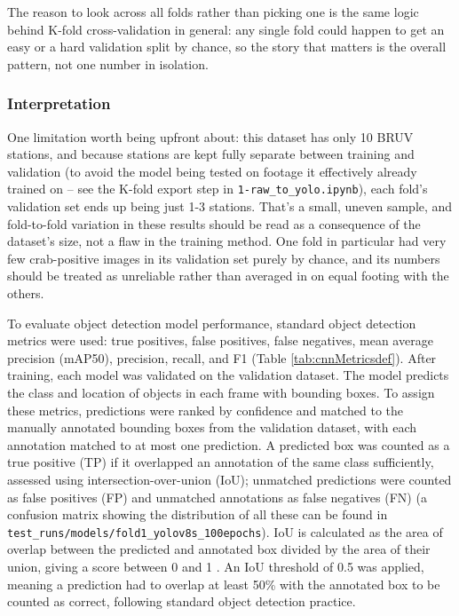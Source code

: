 \documentclass[
]{book}
\begin{document}
The reason to look across all folds rather than picking one is the same logic behind K-fold cross-validation in general: any single fold could happen to get an easy or a hard validation split by chance, so the story that matters is the overall pattern, not one number in isolation.

\subsubsection*{Interpretation}\label{interpretation}

One limitation worth being upfront about: this dataset has only 10 BRUV stations, and because stations are kept fully separate between training and validation (to avoid the model being tested on footage it effectively already trained on -- see the K-fold export step in \texttt{1-raw\_to\_yolo.ipynb}), each fold's validation set ends up being just 1-3 stations. That's a small, uneven sample, and fold-to-fold variation in these results should be read as a consequence of the dataset's size, not a flaw in the training method. One fold in particular had very few crab-positive images in its validation set purely by chance, and its numbers should be treated as unreliable rather than averaged in on equal footing with the others.

To evaluate object detection model performance, standard object detection metrics were used: true positives, false positives, false negatives, mean average precision (mAP50), precision, recall, and F1 (Table \ref{tab:cnnMetricsdef}). After training, each model was validated on the validation dataset. The model predicts the class and location of objects in each frame with bounding boxes. To assign these metrics, predictions were ranked by confidence and matched to the manually annotated bounding boxes from the validation dataset, with each annotation matched to at most one prediction. A predicted box was counted as a true positive (TP) if it overlapped an annotation of the same class sufficiently, assessed using intersection-over-union (IoU); unmatched predictions were counted as false positives (FP) and unmatched annotations as false negatives (FN) (a confusion matrix showing the distribution of all these can be found in \texttt{test\_runs/models/fold1\_yolov8s\_100epochs}). IoU is calculated as the area of overlap between the predicted and annotated box divided by the area of their union, giving a score between 0 and 1 \citep{biscarini_deep_2026}. An IoU threshold of 0.5 was applied, meaning a prediction had to overlap at least 50\% with the annotated box to be counted as correct, following standard object detection practice.
\end{document}
